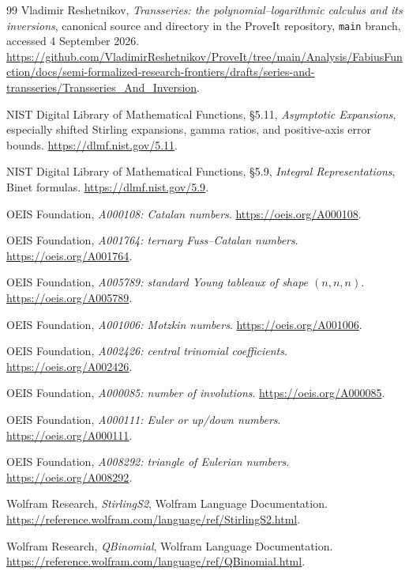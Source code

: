 \documentclass[11pt,a4paper]{article}
\theoremstyle{definition}
\theoremstyle{remark}
\numberwithin{equation}{section}
\begin{document}
\clearpage
{\small
\begin{thebibliography}{99}
\setlength{\itemsep}{0.25em}
\setlength{\parskip}{0pt}
Vladimir Reshetnikov, \emph{Transseries: the polynomial--logarithmic calculus and its inversions}, canonical source and directory in the ProveIt repository, \texttt{main} branch, accessed 4 September 2026.
\url{https://github.com/VladimirReshetnikov/ProveIt/tree/main/Analysis/FabiusFunction/docs/semi-formalized-research-frontiers/drafts/series-and-transseries/Transseries_And_Inversion}.

NIST Digital Library of Mathematical Functions, \S5.11, \emph{Asymptotic Expansions}, especially shifted Stirling expansions, gamma ratios, and positive-axis error bounds. \url{https://dlmf.nist.gov/5.11}.

NIST Digital Library of Mathematical Functions, \S5.9, \emph{Integral Representations}, Binet formulas. \url{https://dlmf.nist.gov/5.9}.

OEIS Foundation, \emph{A000108: Catalan numbers}. \url{https://oeis.org/A000108}.

OEIS Foundation, \emph{A001764: ternary Fuss--Catalan numbers}. \url{https://oeis.org/A001764}.

OEIS Foundation, \emph{A005789: standard Young tableaux of shape $(n,n,n)$}. \url{https://oeis.org/A005789}.

OEIS Foundation, \emph{A001006: Motzkin numbers}. \url{https://oeis.org/A001006}.

OEIS Foundation, \emph{A002426: central trinomial coefficients}. \url{https://oeis.org/A002426}.

OEIS Foundation, \emph{A000085: number of involutions}. \url{https://oeis.org/A000085}.

OEIS Foundation, \emph{A000111: Euler or up/down numbers}. \url{https://oeis.org/A000111}.

OEIS Foundation, \emph{A008292: triangle of Eulerian numbers}. \url{https://oeis.org/A008292}.

Wolfram Research, \emph{StirlingS2}, Wolfram Language Documentation. \url{https://reference.wolfram.com/language/ref/StirlingS2.html}.

Wolfram Research, \emph{QBinomial}, Wolfram Language Documentation. \url{https://reference.wolfram.com/language/ref/QBinomial.html}.


\end{thebibliography}}
\end{document}
